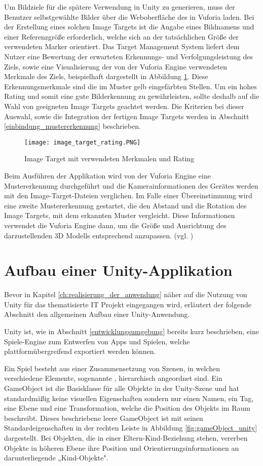 Um Bildziele für die spätere Verwendung in Unity zu generieren, muss der Benutzer selbstgewählte Bilder über die Weboberfläche des  in Vuforia laden.
Bei der Erstellung eines solchen Image Targets ist die Angabe eines Bildnamens und einer Referenzgröße erforderlich, welche sich an der tatsächlichen Größe der verwendeten Marker orientiert.
Das Target Management System liefert dem Nutzer eine Bewertung der erwarteten Erkennungs- und Verfolgungsleistung des Ziels, sowie eine Visualisierung der von der Vuforia Engine verwendeten Merkmale des Ziels, beispielhaft dargestellt in Abbildung \ref{fig:image_target_rating}. 
Diese Erkennungsmerkmale sind die im Muster gelb eingefärbten Stellen.
Um ein hohes Rating und somit eine gute Bilderkennung zu gewährleisten, sollte deshalb auf die Wahl von geeigneten Image Targets geachtet werden.
Die Kriterien bei dieser Auswahl, sowie die Integration der fertigen Image Targets werden in Abschnitt \ref{einbindung_mustererkennung} beschrieben.

\begin{figure} [h]
\centering
\texttt{[image: image\_target\_rating.PNG]}
\caption{Image Target mit verwendeten Merkmalen und Rating}
\label{fig:image_target_rating}
\end{figure}

Beim Ausführen der Applikation wird von der Vuforia Engine eine Mustererkennung durchgeführt und die Kamerainformationen des Gerätes werden mit den Image-Target-Dateien verglichen. 
Im Falle einer Übereinstimmung wird eine zweite Mustererkennung gestartet, die den Abstand und die Rotation des Image Targets, mit dem erkannten Muster vergleicht.
Diese Informationen verwendet die Vuforia Engine dann, um die Größe und Ausrichtung des darzustellenden 3D Modells entsprechend anzupassen. (vgl. \cite{Grahn2017})
\section{Aufbau einer Unity-Applikation}\label{aufbau_unity_app}
Bevor in Kapitel \ref{ch:realisierung_der_anwendung} näher auf die Nutzung von Unity für das thematisierte IT Projekt eingegangen wird, erläutert der folgende Abschnitt den allgemeinen Aufbau einer Unity-Anwendung. 

Unity ist, wie in Abschnitt \ref{entwicklungsumgebung} bereits kurz beschrieben, eine Spiele-Engine zum Entwerfen von Apps und Spielen, welche plattformübergreifend exportiert werden können.

Ein Spiel besteht aus einer Zusammensetzung von Szenen, in welchen verschiedene Elemente, sogenannte , hierarchisch angeordnet sind. 
Ein GameObject ist die Basisklasse für alle Objekte in der Unity-Szene und hat standardmäßig keine visuellen Eigenschaften sondern nur einen Namen, ein Tag, eine Ebene und eine Transformation, welche die Position des Objekts im Raum beschreibt.
Dieses beschriebene leere GameObject ist mit seinen Standardeigenschaften in der rechten Leiste in Abbildung \ref{fig:gameObject_unity} dargestellt.
Bei Objekten, die in einer Eltern-Kind-Beziehung stehen, vererben Objekte in höheren Ebene ihre Position und Orientierungsinformationen an darunterliegende „Kind-Objekte".

